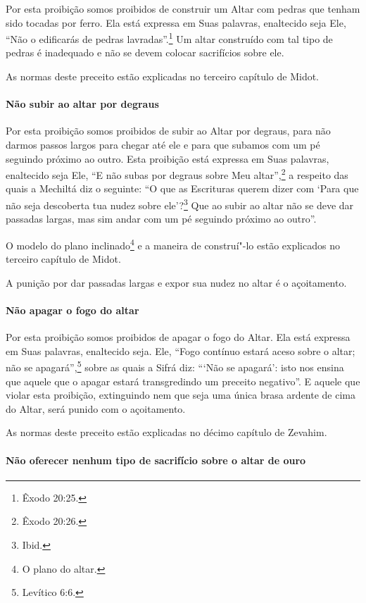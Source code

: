 \begin{multicols}{2}
Por esta proibição somos proibidos de construir um Altar com pedras que
tenham sido tocadas por ferro. Ela está expressa em Suas palavras,
enaltecido seja Ele, ``Não o edificarás de pedras lavradas''.\footnote{Êxodo
20:25.} Um altar construído com tal tipo de pedras é inadequado e não se
devem colocar sacrifícios sobre ele.

As normas deste preceito estão explicadas no terceiro capítulo de Midot\starr.

\paragraph{Não subir ao altar por degraus}

Por esta proibição somos proibidos de subir ao Altar por degraus, para
não darmos passos largos para chegar até ele e para que subamos com um
pé seguindo próximo ao outro. Esta proibição está expressa em Suas
palavras, enaltecido seja Ele, ``E não subas por degraus sobre Meu
altar'',\footnote{Êxodo 20:26.} a respeito das quais a Mechiltá\starr{} diz o seguinte: ``O que as Escrituras querem dizer com `Para que não seja descoberta tua nudez sobre ele'?\footnote{Ibid.} Que ao subir ao altar não se deve dar passadas largas, mas sim
andar com um pé seguindo próximo ao outro''.

O modelo do plano inclinado\footnote{O plano do altar.} e a maneira de
construí"-lo estão explicados no terceiro capítulo de Midot\starr.

A punição por dar passadas largas e expor sua nudez no altar é o
açoitamento.

\paragraph{Não apagar o fogo do altar}

Por esta proibição somos proibidos de apagar o fogo do Altar. Ela está
expressa em Suas palavras, enaltecido seja. Ele, ``Fogo contínuo estará
aceso sobre o altar; não se apagará'',\footnote{Levítico 6:6.} sobre as quais a
Sifrá\starr{} diz: ```Não se apagará': isto nos ensina que aquele que o apagar
estará transgredindo um preceito negativo''. E aquele que violar esta
proibição, extinguindo nem que seja uma única brasa ardente de cima do
Altar, será punido com o açoitamento.

As normas deste preceito estão explicadas no décimo capítulo de Zevahim\starr.

\paragraph{Não oferecer nenhum tipo de sacrifício sobre o altar de ouro}


\end{multicols}
